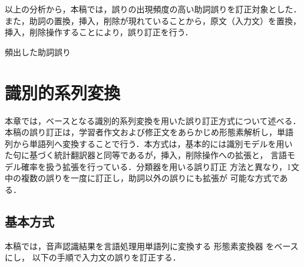 \documentclass[japanese]{jnlp_1.4}
\begin{document}
以上の分析から，本稿では，誤りの出現頻度の高い助詞誤りを訂正対象とした．
また，助詞の置換，挿入，削除が現れていることから，原文（入力文）を置換，
挿入，削除操作することにより，誤り訂正を行う．

\begin{table}[t]
\caption{頻出した助詞誤り}
\label{tbl-particle-errors}

\end{table}



\section{識別的系列変換}
\label{sec-conversion}

本章では，ベースとなる識別的系列変換を用いた誤り訂正方式について述べる．
本稿の誤り訂正は，学習者作文および修正文をあらかじめ形態素解析し，単語
列から単語列へ変換することで行う．本方式は，基本的には識別モデルを用い
た句に基づく統計翻訳器と同等であるが，挿入，削除操作への拡張と，
言語モデル確率を扱う拡張を行っている．分類器を用いる誤り訂正
方法と異なり，1文中の複数の誤りを一度に訂正し，助詞以外の誤りにも拡張が
可能な方式である．


\subsection{基本方式}

本稿では，音声認識結果を言語処理用単語列に変換する
形態素変換器 をベースにし，
以下の手順で入力文の誤りを訂正する．
\end{document}
